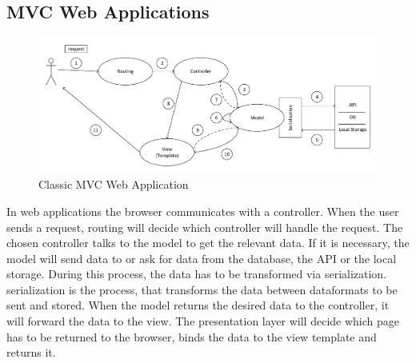 

\subsection{MVC Web Applications}

\begin{figure}[!ht]
	\includegraphics[width=\textwidth]{figures/klasszikus_mvc_webalkalmazas.pdf}
	\caption[Classic MVC Web Application]{Classic MVC Web Application~\cite{mvc-webapp}}
	\label{fig:classic-mvc-webapplication}
\end{figure}

In web applications the browser communicates with a controller. When the user sends a request, routing will decide which controller will handle the request. The chosen controller talks to the model to get the relevant data. If it is necessary, the model will send data to or ask for data from the database, the API or the local storage. During this process, the data has to be transformed via serialization. serialization is the process, that transforms the data between dataformats to be sent and stored. When the model returns the desired data to the controller, it will forward the data to the view. The presentation layer will decide which page has to be returned to the browser, binds the data to the view template and returns it.

